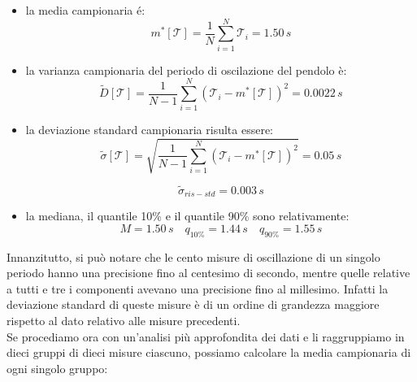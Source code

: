 \begin{itemize}
    \item{la media campionaria é:}
        \begin{equation}
            m^*[\mathcal{T}] = \frac{1}{N} \sum_{i=1}^{N} \mathcal{T}_i = 1.50\,s
        \end{equation} 

    \item{la varianza campionaria del periodo di oscilazione del pendolo è:}
        \begin{equation}
            \tilde{D}[\mathcal{T}] = \frac{1}{N - 1} \sum_{i=1}^{N} (\mathcal{T}_i - m^*[\mathcal{T}])^2 = 0.0022\,s
        \end{equation}

    \item{la deviazione standard campionaria risulta essere:}
        \begin{equation}
            \tilde{\sigma}[\mathcal{T}] = \sqrt{\frac{1}{N - 1} \sum_{i=1}^{N} (\mathcal{T}_i - m^*[\mathcal{T}])^2} = 0.05\,s
        \end{equation}

        \begin{equation}
            \tilde{\sigma}_{ris-std} = 0.003\,s
        \end{equation}

    \item{la mediana, il quantile 10\% e il quantile 90\% sono relativamente:}
        \begin{equation*}
            M = 1.50\,s \quad
            q_{10\%} = 1.44\,s \quad
            q_{90\%} = 1.55\,s
        \end{equation*}
\end{itemize}

Innanzitutto, si può notare che le cento misure di oscillazione di un singolo periodo hanno una precisione fino al centesimo di secondo, mentre quelle relative a tutti e tre i componenti avevano una precisione fino al millesimo. Infatti la deviazione standard di queste misure è di un ordine di grandezza maggiore rispetto al dato relativo alle misure precedenti.\\
Se procediamo ora con un'analisi più approfondita dei dati e li raggruppiamo in dieci gruppi di dieci misure ciascuno, possiamo calcolare la media campionaria di ogni singolo gruppo:

